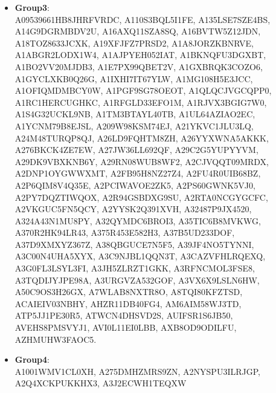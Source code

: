 \begin{itemize}
    \item \textbf{\hypertarget{Group3}{Group3}}: \\
    A09539661HB8JHRFVRDC, A110S3BQL5I1FE, A135LSE7SZE4BS,\\ A14G9DGRMBDV2U, A16AXQ11SZA8SQ, A16BVTW5Z12JDN,\\ A18TOZ8633JCXK, A19XFJFZ7PRSD2, A1A8JORZKBNRVE,\\ A1ABGR2LODX1W4, A1AJPYEH052IAT, A1BKNQFU3DGXBT,\\ A1BO2VV20MJDB3, A1E7PX99QBET2V, A1GXBRQK3COZO6,\\ A1GYCLXKB0Q26G, A1IXHI7IT67YLW, A1MG108H5E3JCC,\\ A1OFIQMDMBCY0W, A1PGF9SG78OEOT, A1QLQCJVGCQPP0,\\ A1RC1HERCUGHKC, A1RFGLD33EFO1M, A1RJVX3BGIG7W0,\\ A1S4G32UCKL9NB, A1TM3BTAYL40TB, A1UL64AZIAO2EC,\\ A1YCNM79B8EJSL, A209W98KSM74EJ, A21YKVC1JLU3LQ,\\ A24M48TURQP8QJ, A26LD9FQHTM8ZH, A26YYXWNA5AKKK,\\ A276BKCK4ZE7EW, A27JW36LL692QF, A29C2G5YUPYYVM,\\ A29DK9VBXKNB6Y, A29RN08WUB8WF2, A2CJVQQT09MRDX,\\ A2DNP1OYGWWXMT, A2FB95H8NZ27Z4, A2FU4R0UIB68BZ,\\ A2P6QIM8V4Q35E, A2PCIWAVOE2ZK5, A2PS60GWNK5VJ0,\\ A2PY7DQZTIWQOX, A2R94GSBDXG9SU, A2RTA0NCGYGCFC,\\ A2VKGUC5FN5QCY, A2YYSK2Q391XVH, A32487P9JX4520,\\ A324A43N1MU8PY, A32QYMDC6BROI3, A35TIC6B8MVKWG,\\ A370R2HK94LR43, A375R453E582H3, A37B5UD233DOF,\\ A37D9XMXYZ367Z, A38QBGUCE7N5F5, A39JF4NO5TYNNI,\\ A3C00N4UHA5XYX, A3C9NJBL1QQN3T, A3CAZVFHLRQEXQ,\\ A3G0FL3LSYL3FI, A3JH5ZLRZT1GKK, A3RFNCMOL3FSE8,\\ A3TQDIJYJPE98A, A3URGVZA532GOF, A3VX6X9LSLN6HW,\\ A50C9OS3H26GX, A7WLAB8NXTR8O, A8TQI80KFZTSD,\\ ACAIEIV03NBHY, AHZR11DB40FG4, AM6AIM58WJ3TD,\\ ATP5JJ1PE30R5, ATWCN4DHSVD2S, AUIFSR1S6JB50,\\ AVEHS8PMSVYJ1, AVI0L11EI0LBB, AXB8OD9ODILFU,\\ AZHMUHW3FAOC5.

    \item \textbf{\hypertarget{Group4}{Group4}}: \\
    A1001WMV1CL0XH, A275DMHZMRS9ZN, A2NYSPU3ILRJGP,\\ A2Q4XCKPUKKHX3, A3J2ECWH1TEQXW
\end{itemize}